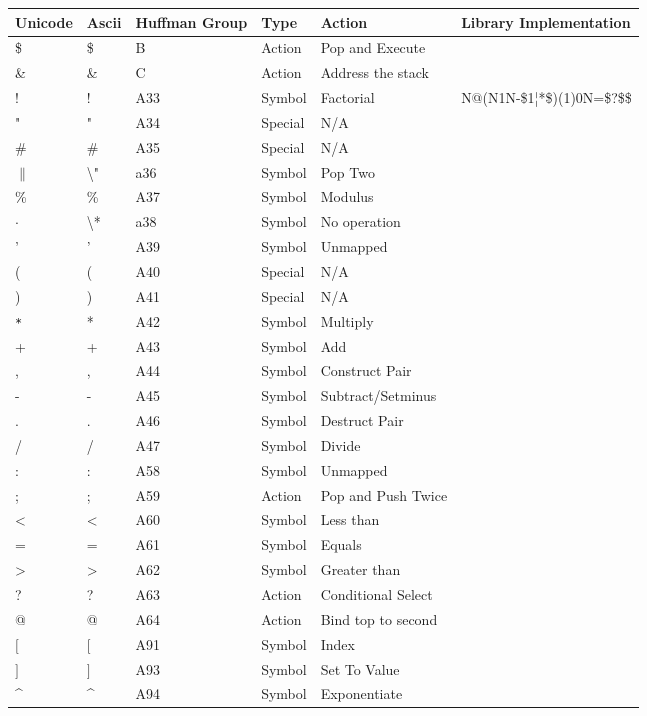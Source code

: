 \documentclass{article}
\makeatletter
\newcommand\escape\textbackslash
\newcommand{\at}{\makeatletter @\makeatother}
\makeatother
\begin{document}
\begin{tabular}{| >{\ttfamily}l| >{\ttfamily}l| >{\ttfamily}l|l|l| >{\ttfamily}l|}
    \hline
    \textbf{Unicode} & \textbf{Ascii} & \textbf{Huffman Group} & \textbf{Type} & \textbf{Action} & \textbf{Library Implementation}\\
    \hline
    \$ & \$ & B & Action & Pop and Execute & \\
    \& & \& & C & Action & Address the stack & \\
    ! & ! & A33 & Symbol & Factorial & {N@(N1N-\$1¦*\$)(1)0N=\$?\$}\$\\
    " & " & A34 & Special & N/A & \\
    \# & \# & A35 & Special & N/A & \\
    $\parallel$ & \escape{"} & a36 & Symbol & Pop Two\\
    \% & \% & A37 & Symbol & Modulus & \\
    $\cdot$ & \escape{*} & a38 & Symbol & No operation & \\
    ' & ' & A39 & Symbol & Unmapped &\\
    ( & ( & A40 & Special & N/A & \\
    ) & ) & A41 & Special & N/A & \\
    \texttt{*} & * & A42 & Symbol & Multiply & \\
    + & + & A43 & Symbol & Add & \\
    , & , & A44 & Symbol & Construct Pair & \\
    - & - & A45 & Symbol & Subtract/Setminus & \\
    . & . & A46 & Symbol & Destruct Pair & \\
    / & / & A47 & Symbol & Divide & \\
    : & : & A58 & Symbol & Unmapped & \\
    ; & ; & A59 & Action & Pop and Push Twice & \\
    < & < & A60 & Symbol & Less than & \\
    = & = & A61 & Symbol & Equals & \\
    > & > & A62 & Symbol & Greater than & \\
    ? & ? & A63 & Action & Conditional Select & \\
    \at & \at & A64 & Action & Bind top to second & \\
    $[$ & $[$ & A91 & Symbol & Index & \\
    $]$ & $]$ & A93 & Symbol & Set To Value & \\
    \^{} & \^{} & A94 & Symbol & Exponentiate & \\

\end{tabular}
\end{document}
